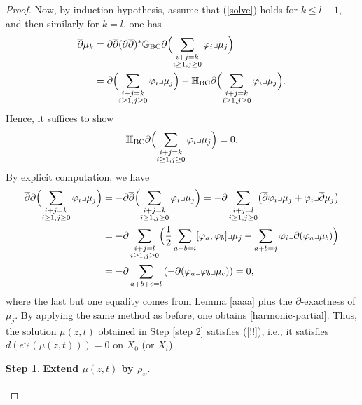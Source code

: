 \documentclass[12pt]{amsart}
\numberwithin{equation}{section}
\theoremstyle{definition}
\newtheorem{step}{Step}
\theoremstyle{definition}
\theoremstyle{definition}
\renewcommand{\1}{\mathsf{1}}
\newcommand{\G}{\mathbb{G}}
\renewcommand{\>}{\rightarrow}
\newcommand{\p}{\partial}
\newcommand{\bp}{\overline\partial}
\renewcommand{\H}{\mathbb H}
\def\p{\partial}
\def\v{\varphi}
\theoremstyle{plain} %
\theoremstyle{plain} %
\theoremstyle{plain} %
\begin{document}
\begin{proof}
		Now, by induction hypothesis, assume that (\ref{solve}) holds for $k\leq {l-1}$, and then similarly for  $k=l$, one has
	\begin{align*}
		\bp \mu_k
		&= \partial \bp (\partial \overline{\partial})^{*} \G_{\mathrm{BC}} \partial \Bigl( \sum_{\substack{i+j=k \\ i \geq 1, j \geq 0}} \varphi_i \lrcorner \mu_j \Bigr) \\
		&= \partial \Bigl( \sum_{\substack{i+j=k \\ i \geq 1, j \geq 0}} \varphi_i \lrcorner \mu_j \Bigr)
		- \H_{\mathrm{BC}} \partial \Bigl( \sum_{\substack{i+j=k \\ i \geq 1, j \geq 0}} \varphi_i \lrcorner \mu_j \Bigr).
	\end{align*}
		Hence, it suffices to show
		\begin{equation}\label{harmonic-partial}
		\H_{\mathrm{BC}} \partial \Bigl( \sum_{\substack{i+j=k \\ i \geq 1, j \geq 0}} \varphi_i \lrcorner \mu_j \Bigr)=0.
		\end{equation} By explicit computation, we have
	\begin{align*}
		\bp \partial \Bigl( \sum_{\substack{i+j=k \\ i \geq 1, j \geq 0}} \varphi_i \lrcorner \mu_j \Bigr)
		&= -\partial \bp \Bigl( \sum_{\substack{i+j=k \\ i \geq 1, j \geq 0}} \varphi_i \lrcorner \mu_j \Bigr)= -\partial \sum_{\substack{i+j=l \\ i \geq 1, j \geq 0}} \bigl( \bp \varphi_i \lrcorner \mu_j + \varphi_i \lrcorner \bp \mu_j \bigr) \\
		&= -\partial \sum_{\substack{i+j=l \\ i \geq 1, j \geq 0}} \Bigl( \frac{1}{2} \sum_{a+b=i} [\varphi_a, \varphi_b] \lrcorner \mu_j
		- \sum_{a+b=j} \varphi_i \lrcorner \partial (\varphi_a \lrcorner \mu_b) \Bigr) \\
		&= -\partial \sum_{a+b+c=l} \left( - \partial (\varphi_a \lrcorner \varphi_b \lrcorner \mu_c) \right) = 0,
	\end{align*}
		where the last but one equality comes from Lemma \ref{aaaa} plus the $\p$-exactness of $\mu_j$.
		By applying the same method as before, one obtains \eqref{harmonic-partial}.  Thus, the solution $\mu(z,t)$ obtained in Step \ref{step 2} satisfies (\ref{!!}), i.e., it satisfies $d(e^{\iota_\varphi}(\mu(z,t)))=0$ on $X_0$ (or $X_t$).
		\begin{step}\label{step 4}
			{\rm\textbf{Extend $\mu(z,t)$ by $\rho_\v$}}.\end{step}

\end{proof}
\end{document}
